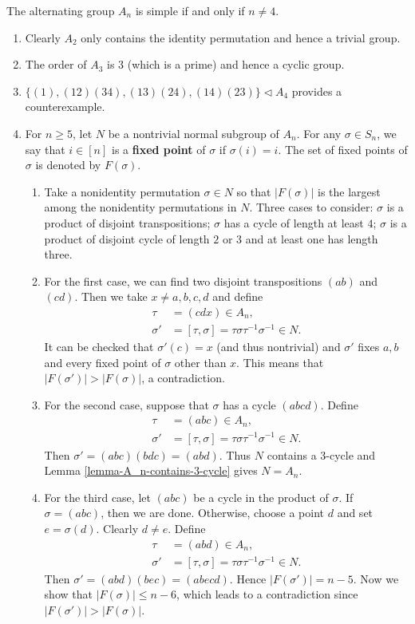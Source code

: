 \begin{theorem}
	The alternating group $A_n$ is simple if and only if $n\neq 4$.
\end{theorem}
\begin{sketch}\hfill
	\begin{enumerate}
		\item Clearly $A_2$ only contains the identity permutation and hence a trivial group.
		\item The order of $A_3$ is $3$ (which is a prime) and hence a cyclic group.
		\item $\{(1),(12)(34),(13)(24),(14)(23)\}\lhd A_4$ provides a counterexample.
		\item For $n\geq 5$, let $N$ be a nontrivial normal subgroup of $A_n$.  For any $\sigma \in S_n$, we say that $i \in [n]$ is a \textbf{fixed point} of $\sigma$ if $\sigma(i) = i$. The set of fixed points of $\sigma$ is denoted by $F(\sigma)$. 
		\begin{enumerate}
			\item Take a nonidentity permutation $\sigma\in N$ so that $|F(\sigma)|$ is the largest among the nonidentity permutations in $N$. Three cases to consider: $\sigma$ is a product of disjoint transpositions; $\sigma$ has a cycle of length at least $4$; $\sigma$ is a product of disjoint cycle of length $2$ or $3$ and at least one has length three.
			\item For the first case, we can find two disjoint transpositions $(ab)$ and $(cd)$. Then we take $x\neq a,b,c,d$ and define
			\begin{align*}
				\tau &= (cdx)\in A_n, \\
				\sigma' &= [\tau,\sigma] = \tau\sigma\tau^{-1}\sigma^{-1} \in N.
			\end{align*}
			It can be checked that $\sigma'(c) = x$ (and thus nontrivial) and  $\sigma'$ fixes $a,b$ and every fixed point of $\sigma$ other than $x$. This means that $|F(\sigma')|>|F(\sigma)|$, a contradiction.
			\item For the second case, suppose that $\sigma$ has a cycle $(abcd)$. Define
			\begin{align*}
				\tau &= (abc)\in A_n, \\
				\sigma' &= [\tau,\sigma] = \tau\sigma\tau^{-1}\sigma^{-1} \in N.
			\end{align*}
			Then $\sigma' = (abc)(bdc) = (abd)$. Thus $N$ contains a $3$-cycle and Lemma \ref{lemma-A_n-contains-3-cycle} gives $N=A_n$.
			\item For the third case, let $(abc)$ be a cycle in the product of $\sigma$. If $\sigma=(abc)$, then we are done. Otherwise, choose a point $d$ and set $e=\sigma(d)$. Clearly $d\neq e$. Define
			\begin{align*}
				\tau &= (abd)\in A_n, \\
				\sigma' &= [\tau,\sigma] = \tau\sigma\tau^{-1}\sigma^{-1} \in N.
			\end{align*}
			Then $\sigma' = (abd)(bec) = (abecd)$. Hence $|F(\sigma')| = n-5$. Now we show that $|F(\sigma)| \leq n-6$, which leads to a contradiction since $|F(\sigma')|>|F(\sigma)|$.
			

\end{enumerate}
\end{enumerate}
\end{sketch}

